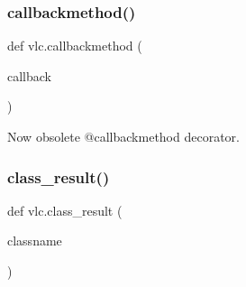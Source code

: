 \subsubsection{\texorpdfstring{callbackmethod()}{callbackmethod()}}
{\footnotesize\ttfamily def vlc.\+callbackmethod (\begin{DoxyParamCaption}\item[{}]{callback }\end{DoxyParamCaption})}

\begin{DoxyVerb}Now obsolete @callbackmethod decorator.\end{DoxyVerb}
 \mbox{\label{namespacevlc_abd89c56c1c1f69dc7c4c602ed938d5b4}} 
\subsubsection{\texorpdfstring{class\+\_\+result()}{class\_result()}}
{\footnotesize\ttfamily def vlc.\+class\+\_\+result (\begin{DoxyParamCaption}\item[{}]{classname }\end{DoxyParamCaption})}

